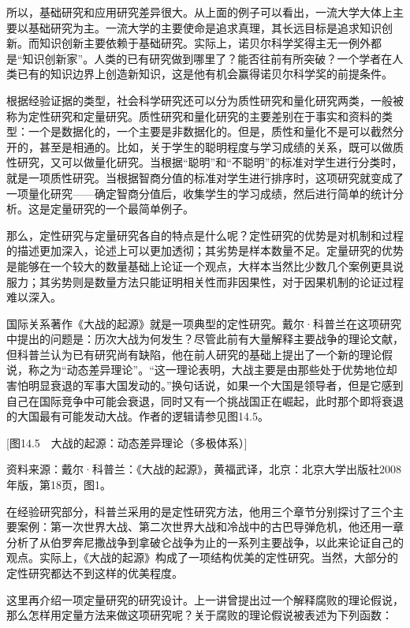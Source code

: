 所以，基础研究和应用研究差异很大。从上面的例子可以看出，一流大学大体上主要以基础研究为主。一流大学的主要使命是追求真理，其长远目标是追求知识创新。而知识创新主要依赖于基础研究。实际上，诺贝尔科学奖得主无一例外都是“知识创新家”。人类的已有研究做到哪里了？能否往前有所突破？一个学者在人类已有的知识边界上创造新知识，这是他有机会赢得诺贝尔科学奖的前提条件。

根据经验证据的类型，社会科学研究还可以分为质性研究和量化研究两类，一般被称为定性研究和定量研究。质性研究和量化研究的主要差别在于事实和资料的类型：一个是数据化的，一个主要是非数据化的。但是，质性和量化不是可以截然分开的，甚至是相通的。比如，关于学生的聪明程度与学习成绩的关系，既可以做质性研究，又可以做量化研究。当根据“聪明”和“不聪明”的标准对学生进行分类时，就是一项质性研究。当根据智商分值的标准对学生进行排序时，这项研究就变成了一项量化研究——确定智商分值后，收集学生的学习成绩，然后进行简单的统计分析。这是定量研究的一个最简单例子。

那么，定性研究与定量研究各自的特点是什么呢？定性研究的优势是对机制和过程的描述更加深入，论述上可以更加透彻；其劣势是样本数量不足。定量研究的优势是能够在一个较大的数量基础上论证一个观点，大样本当然比少数几个案例更具说服力；其劣势则是数量方法只能证明相关性而非因果性，对于因果机制的论证过程难以深入。

国际关系著作《大战的起源》就是一项典型的定性研究。戴尔·科普兰在这项研究中提出的问题是：历次大战为何发生？尽管此前有大量解释主要战争的理论文献，但科普兰认为已有研究尚有缺陷，他在前人研究的基础上提出了一个新的理论假说，称之为“动态差异理论”。“这一理论表明，大战主要是由那些处于优势地位却害怕明显衰退的军事大国发动的。”换句话说，如果一个大国是领导者，但是它感到自己在国际竞争中可能会衰退，同时又有一个挑战国正在崛起，此时那个即将衰退的大国最有可能发动大战。作者的逻辑请参见图14.5。

[图14.5　大战的起源：动态差异理论（多极体系）]

资料来源：戴尔·科普兰：《大战的起源》，黄福武译，北京：北京大学出版社2008年版，第18页，图1。

在经验研究部分，科普兰采用的是定性研究方法，他用三个章节分别探讨了三个主要案例：第一次世界大战、第二次世界大战和冷战中的古巴导弹危机，他还用一章分析了从伯罗奔尼撒战争到拿破仑战争为止的一系列主要战争，以此来论证自己的观点。实际上，《大战的起源》构成了一项结构优美的定性研究。当然，大部分的定性研究都达不到这样的优美程度。

这里再介绍一项定量研究的研究设计。上一讲曾提出过一个解释腐败的理论假说，那么怎样用定量方法来做这项研究呢？关于腐败的理论假说被表述为下列函数：

